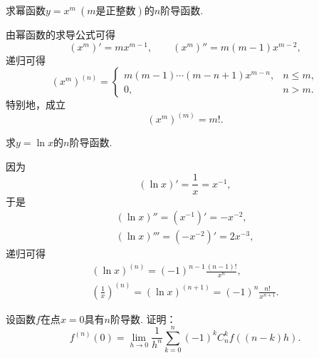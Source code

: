 \begin{example}
求幂函数\(y = x^m\ (\text{$m$是正整数})\)的\(n\)阶导函数.
\begin{solution}
由幂函数的求导公式可得\[
	(x^m)' = m x^{m-1},
	\qquad
	(x^m)'' = m(m-1) x^{m-2},
\]
递归可得\begin{equation}
	(x^m)^{(n)} = \left\{ \begin{array}{cl}
		m(m-1)\dotsm(m-n+1) x^{m-n}, & n \leq m, \\
		0, & n > m.
	\end{array} \right.
\end{equation}
特别地，成立\begin{equation}
	(x^m)^{(m)} = m!.
\end{equation}
\end{solution}
\end{example}

\begin{example}
求\(y = \ln x\)的\(n\)阶导函数.
\begin{solution}
因为\[
	(\ln x)' = \frac1x = x^{-1},
\]
于是\begin{gather*}
	(\ln x)'' = (x^{-1})' = -x^{-2}, \\
	(\ln x)''' = (-x^{-2})' = 2x^{-3},
\end{gather*}
递归可得\begin{gather}
	(\ln x)^{(n)}
	= (-1)^{n-1} \frac{(n-1)!}{x^n}, \\
	\left(\frac1x\right)^{(n)}
	= (\ln x)^{(n+1)}
	= (-1)^n \frac{n!}{x^{n+1}}.
\end{gather}
\end{solution}
\end{example}

\begin{example}
设函数\(f\)在点\(x=0\)具有\(n\)阶导数.
证明：\begin{equation}\label{equation:高阶导数.高阶导数与差分的联系}
	f^{(n)}(0)
	= \lim_{h\to0} \frac1{h^n} \sum_{k=0}^n (-1)^k C_n^k f((n-k)h).
\end{equation}
\end{example}


